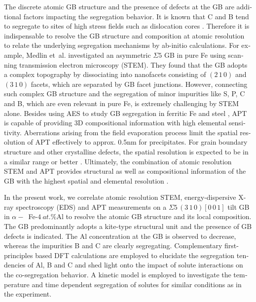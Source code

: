 \documentclass[12pt,a4paper,twoside,twocolumn,english,english]{article}
\begin{document}
\begin{otherlanguage}{english}
The discrete atomic GB structure and the presence of defects at the GB are additional factors impacting the segregation behavior. It is known that C and B tend to segregate to sites of high stress fields such as dislocation cores \cite{da_rosa_co-segregation_2017}.  
Therefore it is indispensable to resolve the GB structure and composition at atomic resolution to relate the underlying segregation mechanisms by ab-initio calculations. For example, Medlin et~al. \cite{medlin_defect_2017} investigated an asymmetric $\Sigma 5$ GB in pure Fe using scanning transmission electron microscopy (STEM). They found that the GB adopts a complex topography by dissociating into nanofacets consisting of $(2\,1\,0)$ and $(3\,1\,0)$ facets, which are separated by GB facet junctions. However, connecting such complex GB structure and the segregation of minor impurities like S, P, C and B, which are even relevant in pure Fe, is extremely challenging by STEM alone. Besides using AES to study GB segregation in ferritic Fe and steel \cite{lejcek_temperature_1990, liu_effect_1992, lejeek_anisotropy_nodate-3}, APT \cite{krakauer_atomic_1993, maruyama_interaction_2003} is capable of providing 3D compositional information with high elemental sensitivity. Aberrations arising from the field evaporation process \cite{Larson2013a, Ashton2020} limit the spatial resolution of APT effectively to approx. 0.5nm \cite{DeGeuser2020} for precipitates. For  grain boundary structure and other crystalline defects, the spatial resolution is expected to be in a similar range or better \cite{Jenkins2020}. Ultimately, the combination of atomic resolution STEM and APT provides structural as well as compositional information of the GB with the highest spatial and elemental resolution \cite{Zhou2016, liebscher_strain-induced_2018-1, liebscher_tetragonal_2018, makineni_diffusive_2018, stoffers_correlating_2017, Herbig2018}.

In the present work, we correlate atomic resolution STEM, energy-dispersive X-ray spectroscopy (EDS) and APT measurements on a $\Sigma 5\,(3\,1\,0)[0\,0\,1]$ tilt GB in $\alpha-$~Fe-$4~at.\%$Al to resolve the atomic GB structure and its local composition. The GB predominantly adopts a kite-type structural unit and the presence of GB defects is indicated. The Al concentration at the GB is observed to decrease, whereas the impurities B and C are clearly segregating. Complementary first-principles based DFT calculations are employed to elucidate the segregation tendencies of Al, B and C and shed light onto the impact of solute interactions on the co-segregation behavior. A kinetic model is employed to investigate the temperature and time dependent segregation of solutes for similar conditions as in the experiment.


\end{otherlanguage}
\end{document}
